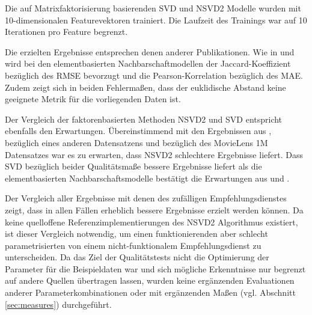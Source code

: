 Die auf Matrixfaktorisierung basierenden SVD und NSVD2 Modelle wurden mit 10-dimensionalen Featurevektoren trainiert. Die Laufzeit des Trainings war auf 10 Iterationen pro Feature begrenzt.

Die erzielten Ergebnisse entsprechen denen anderer Publikationen. Wie in \citep{Herlocker:1999:AFP:312624.312682} und \citep{Candillier:2008} wird bei den elementbasierten Nachbarschaftmodellen der Jaccard-Koeffizient bezüglich des \acs{RMSE} bevorzugt und die Pearson-Korrelation bezüglich des \acs{MAE}. Zudem zeigt sich in beiden Fehlermaßen, dass der euklidische Abstand keine geeignete Metrik für die vorliegenden Daten ist.


Der Vergleich der faktorenbasierten Methoden NSVD2 und SVD entspricht ebenfalls den Erwartungen. Übereinstimmend mit den Ergebnissen aus \citep{Paterek07}, bezüglich eines anderen Datensatzens und \citep{Cacheda2011} bezüglich des MovieLens 1M Datensatzes war es zu erwarten, dass NSVD2 schlechtere Ergebnisse liefert. Dass SVD bezüglich beider Qualitätsmaße bessere Ergebnisse liefert als die elementbasierten Nachbarschaftsmodelle bestätigt die Erwartungen aus \citep{Cacheda2011} und \citep{Koren:2009:MFT:1608565.1608614}.


Der Vergleich aller Ergebnisse mit denen des zufälligen Empfehlungsdienstes zeigt, dass in allen Fällen erheblich bessere Ergebnisse erzielt werden können. Da keine quelloffene Referenzimplementierungen des NSVD2 Algorithmus existiert, ist dieser Vergleich notwendig, um einen funktionierenden aber schlecht parametrisierten von einem nicht-funktionalem Empfehlungsdienst zu unterscheiden. Da das Ziel der Qualitätstests nicht die Optimierung der Parameter für die Beispieldaten war und sich mögliche Erkenntnisse nur begrenzt auf andere Quellen übertragen lassen, wurden keine ergänzenden Evaluationen anderer Parameterkombinationen oder mit ergänzenden Maßen (vgl. Abschnitt \ref{sec:measures}) durchgeführt. \newpage

